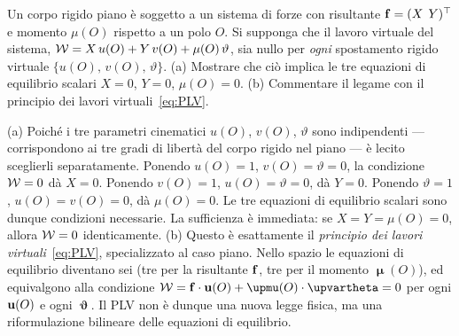 \begin{esercizio}
	\label{ex:C03_LV_equilibrio}
	
	Un corpo rigido piano è soggetto a un sistema di forze con risultante $\mathbf{f} = (X\;\,Y)^\top$ e momento $\mu(O)$ rispetto a un polo $O$. Si supponga che il lavoro virtuale del sistema, $\mathcal{W} = X\,u(O) + Y\,v(O) + \mu(O)\,\vartheta$, sia nullo per \textit{ogni} spostamento rigido virtuale $\{u(O),\,v(O),\,\vartheta\}$.
	(a) Mostrare che ciò implica le tre equazioni di equilibrio scalari $X = 0$, $Y = 0$, $\mu(O) = 0$.
	(b) Commentare il legame con il principio dei lavori virtuali~\eqref{eq:PLV}.
	
	\risultato (a) Poiché i tre parametri cinematici $u(O)$, $v(O)$, $\vartheta$ sono indipendenti --- corrispondono ai tre gradi di libertà del corpo rigido nel piano --- è lecito sceglierli separatamente. Ponendo $u(O) = 1$, $v(O) = \vartheta = 0$, la condizione $\mathcal{W} = 0$ dà $X = 0$. Ponendo $v(O) = 1$, $u(O) = \vartheta = 0$, dà $Y = 0$. Ponendo $\vartheta = 1$, $u(O) = v(O) = 0$, dà $\mu(O) = 0$. Le tre equazioni di equilibrio scalari sono dunque condizioni necessarie. La sufficienza è immediata: se $X = Y = \mu(O) = 0$, allora $\mathcal{W} = 0$ identicamente. (b) Questo è esattamente il \textit{principio dei lavori virtuali}~\eqref{eq:PLV}, specializzato al caso piano. Nello spazio le equazioni di equilibrio diventano sei (tre per la risultante $\mathbf{f}$, tre per il momento $\bm{\upmu}(O)$), ed equivalgono alla condizione $\Wc = \fb \cdot \ub(O) + \bm{\upmu}(O) \cdot \bm{\upvartheta} = 0$ per ogni $\mathbf{u}(O)$ e ogni $\bm{\upvartheta}$. Il PLV non è dunque una nuova legge fisica, ma una riformulazione bilineare delle equazioni di equilibrio.
	
\end{esercizio}



	
